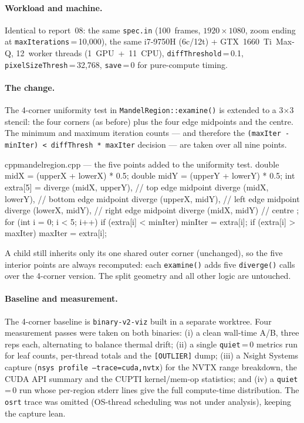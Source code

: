 \documentclass[
	english,
	letterpaper, oneside
]{article}
\begin{document}
\paragraph{Workload and machine.} Identical to report~08: the same
\texttt{spec.in} (100~frames, $1920\times1080$, zoom ending at
\texttt{maxIterations}\,=\,10{,}000), the same i7-9750H (6c/12t) +
GTX~1660~Ti~Max-Q, 12~worker threads (1~GPU~+~11~CPU),
\texttt{diffThreshold}\,=\,0.1, \texttt{pixelSizeThresh}\,=\,32{,}768,
\texttt{save}\,=\,0 for pure-compute timing.

\paragraph{The change.} The 4-corner uniformity test in
\texttt{MandelRegion::examine()} is extended to a 3$\times$3 stencil: the four
corners (as before) plus the four edge midpoints and the centre. The minimum
and maximum iteration counts --- and therefore the
\texttt{(maxIter - minIter) < diffThresh * maxIter} decision --- are taken over
all nine points.

\begin{sourcecode}{cpp}{mandelregion.cpp --- the five points added to the uniformity test.}
double midX = (upperX + lowerX) * 0.5;
double midY = (upperY + lowerY) * 0.5;
int extra[5] = {
  diverge (midX,   upperY),   // top edge midpoint
  diverge (midX,   lowerY),   // bottom edge midpoint
  diverge (upperX, midY),     // left edge midpoint
  diverge (lowerX, midY),     // right edge midpoint
  diverge (midX,   midY)      // centre
};
for (int i = 0; i < 5; i++) {
  if (extra[i] < minIter) minIter = extra[i];
  if (extra[i] > maxIter) maxIter = extra[i];
}
\end{sourcecode}

A child still inherits only its one shared outer corner (unchanged), so the
five interior points are always recomputed: each \texttt{examine()} adds five
\texttt{diverge()} calls over the 4-corner version. The split geometry and all
other logic are untouched.

\paragraph{Baseline and measurement.} The 4-corner baseline is
\texttt{binary-v2-viz} built in a separate worktree. Four measurement passes
were taken on both binaries: (i) a clean wall-time A/B, three reps each,
alternating to balance thermal drift; (ii) a single \texttt{quiet}\,=\,0
metrics run for leaf counts, per-thread totals and the \texttt{[OUTLIER]} dump;
(iii) a Nsight Systems capture
(\texttt{nsys profile --trace=cuda,nvtx}) for the NVTX range breakdown, the
CUDA API summary and the CUPTI kernel/mem-op statistics; and (iv) a
\texttt{quiet}\,=\,0 run whose per-region stderr lines give the full
compute-time distribution. The \texttt{osrt} trace was omitted (OS-thread
scheduling was not under analysis), keeping the capture lean.
\end{document}
